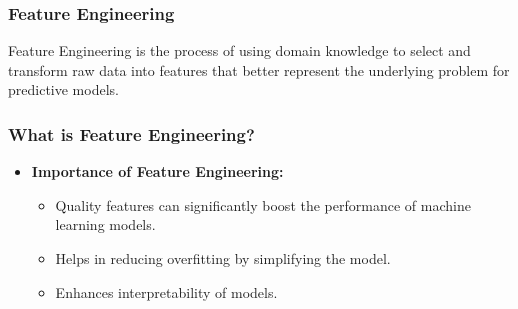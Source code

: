 \documentclass[aspectratio=169]{beamer}
\begin{document}
\begin{frame}[fragile]
  \frametitle{Feature Engineering}
  Feature Engineering is the process of using domain knowledge to select and transform raw data into features that better represent the underlying problem for predictive models.
\end{frame}

\begin{frame}[fragile]
  \frametitle{What is Feature Engineering?}
  \begin{itemize}
    \item \textbf{Importance of Feature Engineering:}
      \begin{itemize}
        \item Quality features can significantly boost the performance of machine learning models.
        \item Helps in reducing overfitting by simplifying the model.
        \item Enhances interpretability of models.
      \end{itemize}
  \end{itemize}
\end{frame}
\end{document}
